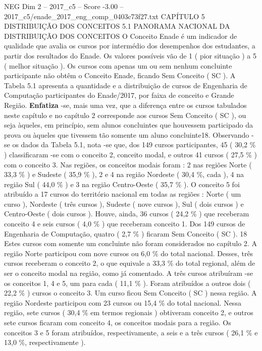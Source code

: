 \begin{textsample}{NEG Dim 2 – 2017\_c5 – Score -3.00 – 2017\_c5/enade\_2017\_eng\_comp\_0403c73f27.txt}  \label{ex:f2_neg_048}
CAPÍTULO 5 DISTRIBUIÇÃO DOS CONCEITOS 5.1 PANORAMA NACIONAL DA DISTRIBUIÇÃO DOS CONCEITOS O Conceito Enade é um indicador de qualidade que avalia os cursos por intermédio dos desempenhos dos estudantes, a partir dos resultados do Enade.
Os valores possíveis vão de 1 ( pior situação ) a 5 ( melhor situação ).
Os cursos com apenas um ou sem nenhum concluinte participante não obtêm o Conceito Enade, ficando Sem Conceito ( SC ).
A Tabela 5.1 apresenta a quantidade e a distribuição de cursos de Engenharia de Computação participantes do Enade/2017, por faixa de conceito e Grande Região. \textbf{Enfatiza} -se, mais uma vez, que a diferença entre os cursos tabulados neste capítulo e no capítulo 2 corresponde aos cursos Sem Conceito ( SC ), ou seja àqueles, em princípio, sem alunos concluintes que houvessem participado da prova ou àqueles que tivessem tão somente um aluno concluinte18.
Observando -se os dados da Tabela 5.1, nota -se que, dos 149 cursos participantes, 45 ( 30,2 \% ) classificaram -se com o conceito 2, conceito modal, e outros 41 cursos ( 27,5 \% ) com o conceito 3.
Nas regiões, os conceitos modais foram : 2 nas regiões Norte ( 33,3 \% ) e Sudeste ( 35,9 \% ), 2 e 4 na região Nordeste ( 30,4 \%, cada ), 4 na região Sul ( 44,0 \% ) e 3 na região Centro-Oeste ( 35,7 \% ).
O conceito 5 foi atribuído a 17 cursos do território nacional em todas as regiões : Norte ( um curso ), Nordeste ( três cursos ), Sudeste ( nove cursos ), Sul ( dois cursos ) e Centro-Oeste ( dois cursos ).
Houve, ainda, 36 cursos ( 24,2 \% ) que receberam conceito 4 e seis cursos ( 4,0 \% ) que receberam conceito 1.
Dos 149 cursos de Engenharia de Computação, quatro ( 2,7 \% ) ficaram Sem Conceito ( SC ). 18 Estes cursos com somente um concluinte não foram considerados no capítulo 2.
A região Norte participou com nove cursos ou 6,0 \% do total nacional.
Desses, três cursos receberam o conceito 2, o que equivale a 33,3 \% do total regional, além de ser o conceito modal na região, como já comentado.
A três cursos atribuíram -se os conceitos 1, 4 e 5, um para cada ( 11,1 \% ).
Foram atribuídos a outros dois ( 22,2 \% ) cursos o conceito 3.
Um curso ficou Sem Conceito ( SC ) nessa região.
A região Nordeste participou com 23 cursos ou 15,4 \% do total nacional.
Nessa região, sete cursos ( 30,4 \% em termos regionais ) obtiveram conceito 2, e outros sete cursos ficaram com conceito 4, os conceitos modais para a região.
Os conceitos 3 e 5 foram atribuídos, respectivamente, a seis e a três cursos ( 26,1 \% e 13,0 \%, respectivamente ).

\end{textsample}
